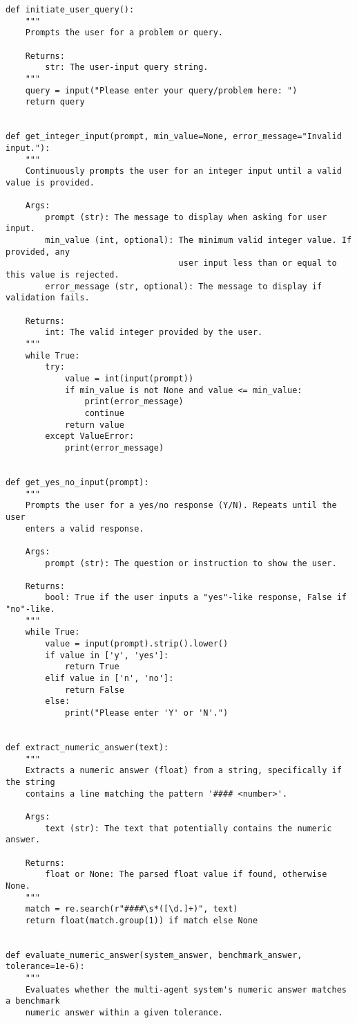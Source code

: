\begin{lstlisting}
def initiate_user_query():
    """
    Prompts the user for a problem or query.

    Returns:
        str: The user-input query string.
    """
    query = input("Please enter your query/problem here: ")
    return query


def get_integer_input(prompt, min_value=None, error_message="Invalid input."):
    """
    Continuously prompts the user for an integer input until a valid value is provided.

    Args:
        prompt (str): The message to display when asking for user input.
        min_value (int, optional): The minimum valid integer value. If provided, any
                                   user input less than or equal to this value is rejected.
        error_message (str, optional): The message to display if validation fails.

    Returns:
        int: The valid integer provided by the user.
    """
    while True:
        try:
            value = int(input(prompt))
            if min_value is not None and value <= min_value:
                print(error_message)
                continue
            return value
        except ValueError:
            print(error_message)


def get_yes_no_input(prompt):
    """
    Prompts the user for a yes/no response (Y/N). Repeats until the user
    enters a valid response.

    Args:
        prompt (str): The question or instruction to show the user.

    Returns:
        bool: True if the user inputs a "yes"-like response, False if "no"-like.
    """
    while True:
        value = input(prompt).strip().lower()
        if value in ['y', 'yes']:
            return True
        elif value in ['n', 'no']:
            return False
        else:
            print("Please enter 'Y' or 'N'.")


def extract_numeric_answer(text):
    """
    Extracts a numeric answer (float) from a string, specifically if the string
    contains a line matching the pattern '#### <number>'.

    Args:
        text (str): The text that potentially contains the numeric answer.

    Returns:
        float or None: The parsed float value if found, otherwise None.
    """
    match = re.search(r"####\s*([\d.]+)", text)
    return float(match.group(1)) if match else None


def evaluate_numeric_answer(system_answer, benchmark_answer, tolerance=1e-6):
    """
    Evaluates whether the multi-agent system's numeric answer matches a benchmark
    numeric answer within a given tolerance.


\end{lstlisting}
